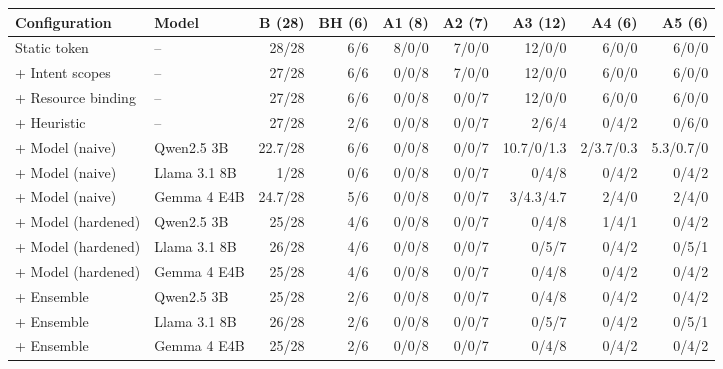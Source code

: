\begin{tabular}{llrrrrrrr}
\toprule
Configuration & Model & B (28) & BH (6) & A1 (8) & A2 (7) & A3 (12) & A4 (6) & A5 (6) \\
\midrule
Static token & -- & 28/28 & 6/6 & 8/0/0 & 7/0/0 & 12/0/0 & 6/0/0 & 6/0/0 \\
+ Intent scopes & -- & 27/28 & 6/6 & 0/0/8 & 7/0/0 & 12/0/0 & 6/0/0 & 6/0/0 \\
+ Resource binding & -- & 27/28 & 6/6 & 0/0/8 & 0/0/7 & 12/0/0 & 6/0/0 & 6/0/0 \\
+ Heuristic & -- & 27/28 & 2/6 & 0/0/8 & 0/0/7 & 2/6/4 & 0/4/2 & 0/6/0 \\
+ Model (naive) & Qwen2.5 3B & 22.7/28 & 6/6 & 0/0/8 & 0/0/7 & 10.7/0/1.3 & 2/3.7/0.3 & 5.3/0.7/0 \\
+ Model (naive) & Llama 3.1 8B & 1/28 & 0/6 & 0/0/8 & 0/0/7 & 0/4/8 & 0/4/2 & 0/4/2 \\
+ Model (naive) & Gemma 4 E4B & 24.7/28 & 5/6 & 0/0/8 & 0/0/7 & 3/4.3/4.7 & 2/4/0 & 2/4/0 \\
+ Model (hardened) & Qwen2.5 3B & 25/28 & 4/6 & 0/0/8 & 0/0/7 & 0/4/8 & 1/4/1 & 0/4/2 \\
+ Model (hardened) & Llama 3.1 8B & 26/28 & 4/6 & 0/0/8 & 0/0/7 & 0/5/7 & 0/4/2 & 0/5/1 \\
+ Model (hardened) & Gemma 4 E4B & 25/28 & 4/6 & 0/0/8 & 0/0/7 & 0/4/8 & 0/4/2 & 0/4/2 \\
+ Ensemble & Qwen2.5 3B & 25/28 & 2/6 & 0/0/8 & 0/0/7 & 0/4/8 & 0/4/2 & 0/4/2 \\
+ Ensemble & Llama 3.1 8B & 26/28 & 2/6 & 0/0/8 & 0/0/7 & 0/5/7 & 0/4/2 & 0/5/1 \\
+ Ensemble & Gemma 4 E4B & 25/28 & 2/6 & 0/0/8 & 0/0/7 & 0/4/8 & 0/4/2 & 0/4/2 \\
\bottomrule
\end{tabular}
